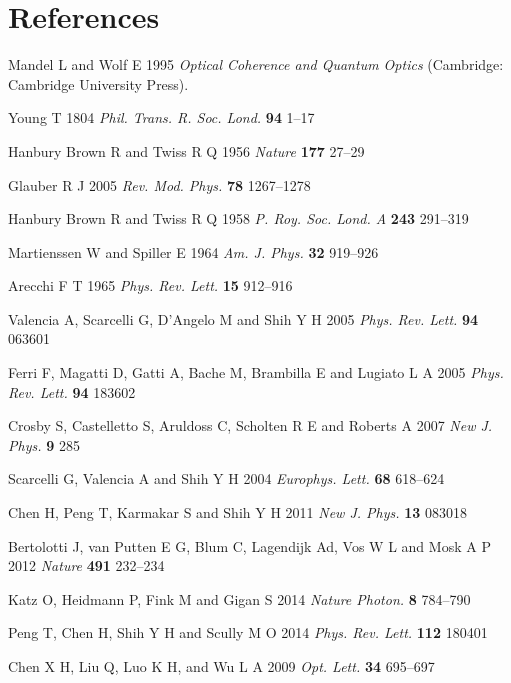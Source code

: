 \documentclass[12pt]{iopart}
\begin{document}
\section*{References}
\begin{thebibliography}{99}  

 Mandel L and Wolf E 1995 \textit{Optical Coherence and Quantum Optics} (Cambridge: Cambridge University Press).

 Young T 1804 \textit{Phil. Trans. R. Soc. Lond.} \textbf{94} 1--17

 Hanbury Brown R and Twiss R Q 1956 \textit{Nature} \textbf{177} 27--29

 Glauber R J  2005 \textit{Rev. Mod. Phys.} \textbf{78} 1267--1278

 Hanbury Brown R and Twiss R Q 1958 \textit{P. Roy. Soc. Lond. A} \textbf{243} 291--319

 Martienssen W and  Spiller E 1964 \textit{Am. J. Phys.} \textbf{32} 919--926

 Arecchi F T 1965 \textit{Phys. Rev. Lett.} \textbf{15} 912--916

 Valencia A, Scarcelli G, D'Angelo M and Shih Y H 2005 \textit{Phys. Rev. Lett.} \textbf{94} 063601

 Ferri F, Magatti D, Gatti A, Bache M, Brambilla E and Lugiato L A 2005 \textit{Phys. Rev. Lett.} \textbf{94} 183602

 Crosby S, Castelletto S, Aruldoss C, Scholten R E and Roberts A 2007 \textit{New J. Phys.} \textbf{9} 285

 Scarcelli G, Valencia A and Shih Y H 2004 \textit{Europhys. Lett.} \textbf{68} 618--624

 Chen H, Peng T, Karmakar S and Shih Y H 2011 \textit{New J. Phys.} \textbf{13} 083018

 Bertolotti J, van Putten E G, Blum C, Lagendijk Ad, Vos W L and Mosk A P 2012 \textit{Nature} \textbf{491} 232--234

 Katz O, Heidmann P, Fink M and Gigan S 2014 \textit{Nature Photon.} \textbf{8} 784--790 

 Peng T, Chen H, Shih Y H and Scully M O 2014 \textit{Phys. Rev. Lett.} \textbf{112} 180401

 Chen X H, Liu Q, Luo K H, and Wu L A 2009 \textit{Opt. Lett.} \textbf{34} 695--697


\end{thebibliography}
\end{document}
